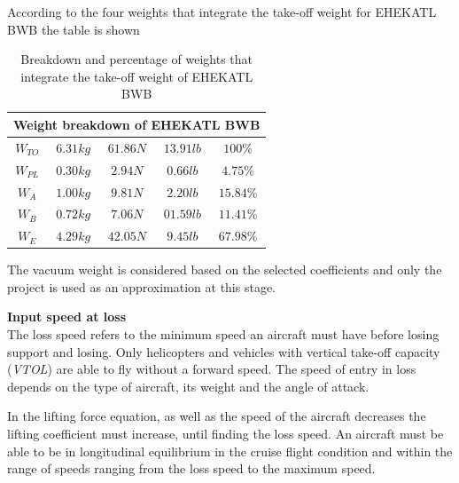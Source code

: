 According to the four weights that integrate the take-off weight for EHEKATL BWB the table is shown 
\begin{table}[!h]
    \centering
    \begin{tabular}{|c|c|c|c|c|}
    \hline
    \multicolumn{5}{|c|}{Weight breakdown of EHEKATL BWB}\\
    \hline
     \textbf{$W_{TO}$} & \textbf{$6.31 kg$} & \textbf{$61.86 N$} & \textbf{$13.91 lb$} & $100 \% $  \\
     \hline
      $W_{PL}$ & \textit{$0.30 kg$} & \textit{$2.94  N$} & \textit{$0.66 lb$} & $ 4.75 \% $\\
      $W_{A}$  & \textit{$1.00 kg$} & \textit{$9.81  N$} & \textit{$2.20  lb$} &  $ 15.84 \% $  \\
      $W_{B}$  & \textit{$0.72 kg$} & \textit{$7.06  N$} & \textit{$01.59 lb$} &  $ 11.41 \% $ \\
      $W_{E}$  & \textit{$4.29 kg$} & \textit{$42.05  N$} & \textit{$9.45 lb$} &  $ 67.98 \% $ \\
    \hline
    \end{tabular}
    \caption{Breakdown and percentage of weights that integrate the take-off weight of EHEKATL BWB}
    \label{desglose y porcentaje de pesos}
\end{table}


The vacuum weight is considered based on the selected coefficients and only the project is used as an approximation at this stage.

\bigskip
\textbf{Input speed at loss}\\
The loss speed refers to the minimum speed an aircraft must have before losing support and losing. Only helicopters and vehicles with vertical take-off capacity (\textit{VTOL}) are able to fly without a forward speed. The speed of entry in loss depends on the type of aircraft, its weight and the angle of attack. 

In the lifting force equation, as well as the speed of the aircraft decreases the lifting coefficient must increase, until finding the loss speed. An aircraft must be able to be in longitudinal equilibrium in the cruise flight condition and within the range of speeds ranging from the loss speed to the maximum speed. 

